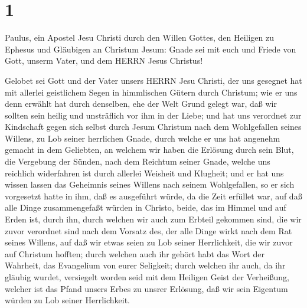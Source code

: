 \hypertarget{section}{%
\section{1}\label{section}}

 Paulus, ein Apostel Jesu Christi durch den Willen Gottes,
den Heiligen zu Ephesus und Gläubigen an Christum Jesum: 
Gnade sei mit euch und Friede von Gott, unserm Vater, und dem HERRN
Jesus Christus!

 Gelobet sei Gott und der Vater unsers HERRN Jesu Christi,
der uns gesegnet hat mit allerlei geistlichem Segen in himmlischen
Gütern durch Christum;  wie er uns denn erwählt hat durch
denselben, ehe der Welt Grund gelegt war, daß wir sollten sein heilig
und unsträflich vor ihm in der Liebe;  und hat uns verordnet
zur Kindschaft gegen sich selbst durch Jesum Christum nach dem
Wohlgefallen seines Willens,  zu Lob seiner herrlichen
Gnade, durch welche er uns hat angenehm gemacht in dem Geliebten,
 an welchem wir haben die Erlösung durch sein Blut, die
Vergebung der Sünden, nach dem Reichtum seiner Gnade, 
welche uns reichlich widerfahren ist durch allerlei Weisheit und
Klugheit;  und er hat uns wissen lassen das Geheimnis seines
Willens nach seinem Wohlgefallen, so er sich vorgesetzt hatte in ihm,
 daß es ausgeführt würde, da die Zeit erfüllet war, auf daß
alle Dinge zusammengefaßt würden in Christo, beide, das im Himmel und
auf Erden ist, durch ihn,  durch welchen wir auch zum
Erbteil gekommen sind, die wir zuvor verordnet sind nach dem Vorsatz
des, der alle Dinge wirkt nach dem Rat seines Willens,  auf
daß wir etwas seien zu Lob seiner Herrlichkeit, die wir zuvor auf
Christum hofften;  durch welchen auch ihr gehört habt das
Wort der Wahrheit, das Evangelium von eurer Seligkeit; durch welchen ihr
auch, da ihr gläubig wurdet, versiegelt worden seid mit dem Heiligen
Geist der Verheißung,  welcher ist das Pfand unsers Erbes
zu unsrer Erlösung, daß wir sein Eigentum würden zu Lob seiner
Herrlichkeit.


